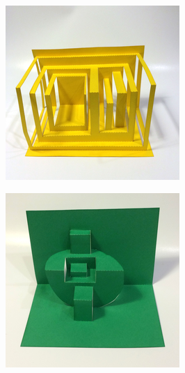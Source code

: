 \begin{figure}[htbp]
\centering
\includegraphics{figures/92_Appendix_Visual_Aids_Materials/completed_card4.png}
\caption{}
\end{figure}

\begin{figure}[htbp]
\centering
\includegraphics{figures/92_Appendix_Visual_Aids_Materials/completed_card5.png}
\caption{}
\end{figure}

\clearpage
